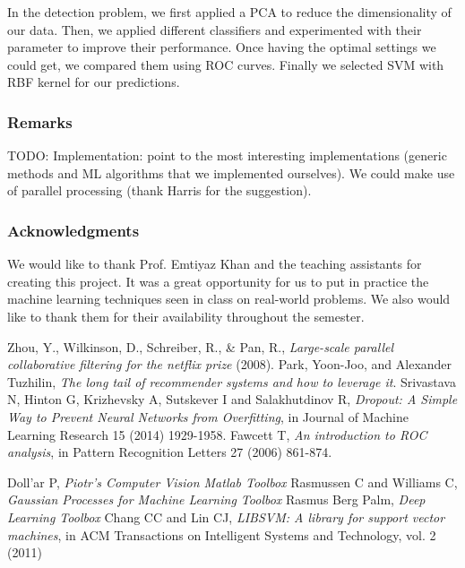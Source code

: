 \documentclass[10pt,a4paper]{article}
\begin{document}
  In the detection problem, we first applied a PCA to reduce the dimensionality of our data. Then, we applied different classifiers and experimented with their parameter to improve their performance. Once having the optimal settings we could get, we compared them using ROC curves. Finally we selected SVM with RBF kernel for our predictions.

    \subsubsection*{Remarks}
    TODO: Implementation: point to the most interesting implementations (generic methods and ML algorithms that we implemented ourselves). We could make use of parallel processing (thank Harris for the suggestion).

    \subsubsection*{Acknowledgments}
    We would like to thank Prof. Emtiyaz Khan and the teaching assistants for creating this project. It was a great opportunity for us to put in practice the machine learning techniques seen in class on real-world problems. We also would like to thank them for their availability throughout the semester.\\

    \begin{thebibliography}{99}

       Zhou, Y., Wilkinson, D., Schreiber, R., \& Pan, R., \textit{Large-scale parallel collaborative filtering for the netflix prize} (2008).
       Park, Yoon-Joo, and Alexander Tuzhilin, \textit{The long tail of recommender systems and how to leverage it}.
       Srivastava N, Hinton G, Krizhevsky A, Sutskever I and Salakhutdinov R, \textit{Dropout: A Simple Way to Prevent Neural Networks from Overfitting}, in Journal of Machine Learning Research 15 (2014) 1929-1958.
       Fawcett T, \textit{An introduction to ROC analysis}, in Pattern Recognition Letters 27 (2006) 861-874.

       Doll'ar P, \textit{Piotr's Computer Vision Matlab Toolbox}
       Rasmussen C and Williams C, \textit{Gaussian Processes for Machine Learning Toolbox}
       Rasmus Berg Palm, \textit{Deep Learning Toolbox}
       Chang CC and Lin CJ, \textit{LIBSVM: A library for support vector machines}, in ACM Transactions on Intelligent Systems and Technology, vol. 2 (2011)

    \end{thebibliography}
\end{document}
